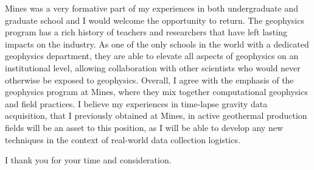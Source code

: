 \documentclass[11pt, a4paper]{awesome-cv}
\begin{document}
\begin{cvletter}
Mines was a very formative part of my experiences in both undergraduate and graduate school and I would welcome the opportunity to return. The geophysics program has a rich history of teachers and researchers that have left lasting impacts on the industry. As one of the only schools in the world with a dedicated geophysics department, they are able to elevate all aspects of geophysics on an institutional level, allowing collaboration with other scientists who would never otherwise be exposed to geophysics. Overall, I agree with the emphasis of the geophysics program at Mines, where they mix together computational geophysics and field practices. I believe my experiences in time-lapse gravity data acquisition, that I previously obtained at Mines, in active geothermal production fields will be an asset to this position, as I will be able to develop any new techniques in the context of real-world data collection logistics.

I thank you for your time and consideration.

\end{cvletter}
\makeletterclosing
\end{document}
